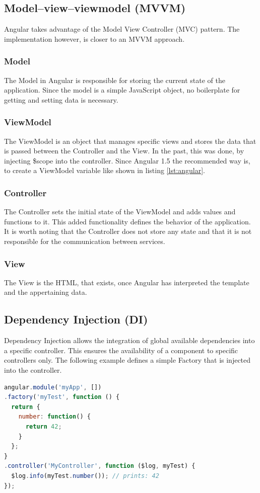 \subsection{Model–view–viewmodel (MVVM)}
Angular takes advantage of the Model View Controller (MVC) pattern. The implementation however, is closer to an MVVM approach. 

\subsubsection{Model}
The Model in Angular is responsible for storing the current state of the application. Since the model is a simple JavaScript object, no boilerplate for getting and setting data is necessary.

\subsubsection{ViewModel}
The ViewModel is an object that manages specific views and stores the data that is passed between the Controller and the View. In the past, this was done, by injecting \$scope into the controller. Since Angular 1.5 the recommended way is, to create a ViewModel variable like shown in listing \ref{lst:angular}.

\subsubsection{Controller}
The Controller sets the initial state of the ViewModel and adds values and functions to it. This added functionality defines the behavior of the application. It is worth noting that the Controller does not store any state and that it is not responsible for the communication between services.

\subsubsection{View}
The View is the HTML, that exists, once Angular has interpreted the template and the appertaining data.

\subsection{Dependency Injection (DI)}
Dependency Injection allows the integration of global available dependencies into a specific controller. This ensures the availability of a component to specific controllers only. The following example defines a simple Factory that is injected into the controller.\\

\begin{lstlisting}[language=JavaScript, caption=Dependency Injection Beispiel]
angular.module('myApp', [])
.factory('myTest', function () {
  return {
    number: function() {
	  return 42;
    }
  };
}
.controller('MyController', function ($log, myTest) {
  $log.info(myTest.number()); // prints: 42
});
\end{lstlisting}
